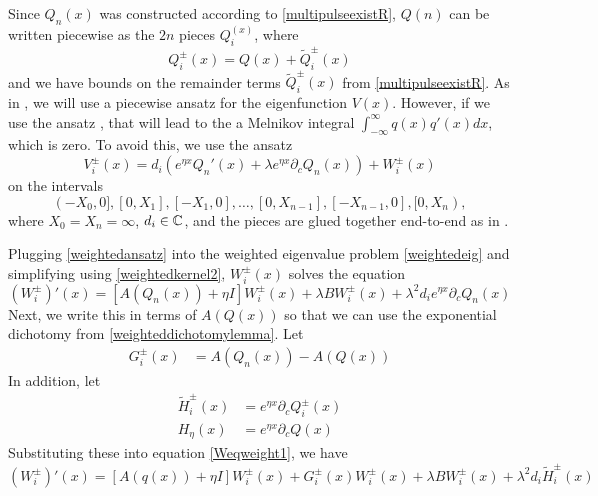 \documentclass[thesis.tex]{subfiles}
\begin{document}
Since $Q_n(x)$ was constructed according to \cref{multipulseexistR}, $Q(n)$ can be written piecewise as the $2n$ pieces $Q_i^(x)$, where
\[
Q_i^\pm(x) = Q(x) + \tilde{Q}_i^\pm(x)
\]
and we have bounds on the remainder terms $\tilde{Q}_i^\pm(x)$ from \cref{multipulseexistR}. As in \cite{Sandstede1998}, we will use a piecewise ansatz for the eigenfunction $V(x)$. However, if we use the ansatz \cite[(3.5)]{Sandstede1998}, that will lead to the a Melnikov integral $\int_{-\infty}^\infty q(x) q'(x) dx$, which is zero. To avoid this, we use the ansatz
\begin{equation}\label{weightedansatz}
V_i^\pm(x) = d_i (e^{\eta x} Q_n'(x) + \lambda e^{\eta x} \partial_c Q_n(x)) + W_i^\pm(x)
\end{equation}
on the intervals 
\[
(-X_0, 0], [0, X_1], [-X_1, 0], \dots, [0, X_{n-1}], [-X_{n-1}, 0], [0, X_n),
\]
where $X_0 = X_n = \infty$, $d_i \in \mathbb{C}$, and the pieces are glued together end-to-end as in \cite{Sandstede1998}.

Plugging \cref{weightedansatz} into the weighted eigenvalue problem \cref{weightedeig} and simplifying using \cref{weightedkernel2}, $W_i^\pm(x)$ solves the equation
\begin{equation}\label{Weqweight1}
(W_i^\pm)'(x) = [A(Q_n(x)) + \eta I] W_i^\pm(x) + \lambda B W_i^\pm(x) + \lambda^2 d_i e^{\eta x} \partial_c Q_n(x)
\end{equation}
Next, we write this in terms of $A(Q(x))$ so that we can use the exponential dichotomy from \cref{weighteddichotomylemma}. Let
\begin{align*}
G_i^\pm(x) &= A(Q_n(x)) - A(Q(x))
\end{align*}
In addition, let
\begin{align*}
\tilde{H}_i^\pm(x) &= e^{\eta x} \partial_c Q_i^\pm(x) \\
H_\eta(x) &= e^{\eta x} \partial_c Q(x)
\end{align*}
Substituting these into equation \cref{Weqweight1}, we have
\begin{equation}\label{Weqweight2}
(W_i^\pm)'(x) = [A(q(x)) + \eta I] W_i^\pm(x)+ G_i^\pm(x)W_i^\pm(x) + \lambda B W_i^\pm(x) + \lambda^2 d_i \tilde{H}_i^\pm(x)
\end{equation}
\end{document}
